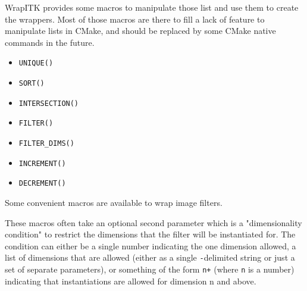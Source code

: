 \documentclass{InsightArticle}
\begin{document}
WrapITK provides some macros to manipulate those list and use them
to create the wrappers. Most of those macros are there to fill a lack
of feature to manipulate lists in CMake, and should be replaced by
some CMake native commands in the future.

\begin{itemize}
  \item \verb$UNIQUE()$

  \item \verb$SORT()$

  \item \verb$INTERSECTION()$

  \item \verb$FILTER()$

  \item \verb$FILTER_DIMS()$

  \item \verb$INCREMENT()$

  \item \verb$DECREMENT()$

\end{itemize}


Some convenient macros are available to wrap image filters.

These macros often take an optional second parameter which is a "dimensionality
condition" to restrict the dimensions that the filter will be instantiated
for. The condition can either be a single number indicating the one dimension
allowed, a list of dimensions that are allowed (either as a single \verb$-$delimited
string or just a set of separate parameters), or something of the form \verb$n+$
(where \verb$n$ is a number) indicating that instantiations are allowed for dimension
n and above.
\end{document}
